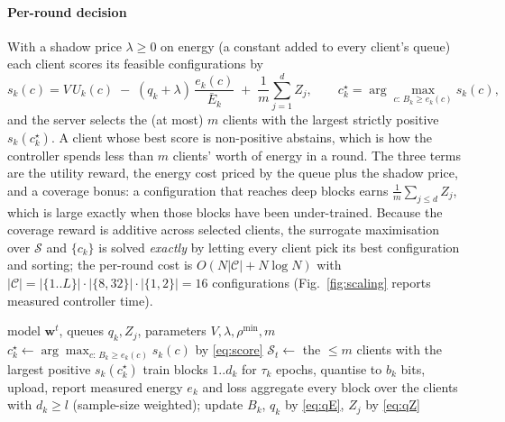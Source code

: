 \paragraph{Per-round decision}
With a shadow price $\lambda\ge0$ on energy (a constant added to every client's queue) each client scores its feasible configurations by
\begin{equation}\label{eq:score}
s_k(c)=V\,U_k(c)\;-\;(q_k+\lambda)\,\frac{e_k(c)}{\bar E_k}\;+\;\frac1m\sum_{j=1}^{d}Z_j ,
\qquad c_k^\star=\arg\max_{c:\,B_k\ge e_k(c)}s_k(c),
\end{equation}
and the server selects the (at most) $m$ clients with the largest strictly positive $s_k(c_k^\star)$. A client whose best score is non-positive abstains, which is how the controller spends less than $m$ clients' worth of energy in a round. The three terms are the utility reward, the energy cost priced by the queue plus the shadow price, and a coverage bonus: a configuration that reaches deep blocks earns $\frac1m\sum_{j\le d}Z_j$, which is large exactly when those blocks have been under-trained. Because the coverage reward is additive across selected clients, the surrogate maximisation over $\mathcal S$ and $\{c_k\}$ is solved \emph{exactly} by letting every client pick its best configuration and sorting; the per-round cost is $O(N|\mathcal C|+N\log N)$ with $|\mathcal C|=|\{1..L\}|\cdot|\{8,32\}|\cdot|\{1,2\}|=16$ configurations (Fig.~\ref{fig:scaling} reports measured controller time).

\begin{algorithm}[t]
\caption{EcoFed round $t$}\label{alg:ecofed}
\begin{algorithmic}[1]
\Require model $\mathbf w^t$, queues $q_k,Z_j$, parameters $V,\lambda,\rho^{\min},m$
 
  \State $c^\star_k\gets\arg\max_{c:\,B_k\ge e_k(c)}s_k(c)$ by \eqref{eq:score}
\EndFor
\State $\mathcal S_t\gets$ the $\le m$ clients with the largest positive $s_k(c_k^\star)$
  \State train blocks $1..d_k$ for $\tau_k$ epochs, quantise to $b_k$ bits, upload, report measured energy $e_k$ and loss
\EndFor
\State aggregate every block over the clients with $d_k\ge l$ (sample-size weighted); update $B_k$, $q_k$ by \eqref{eq:qE}, $Z_j$ by \eqref{eq:qZ}
\end{algorithmic}
\end{algorithm}

